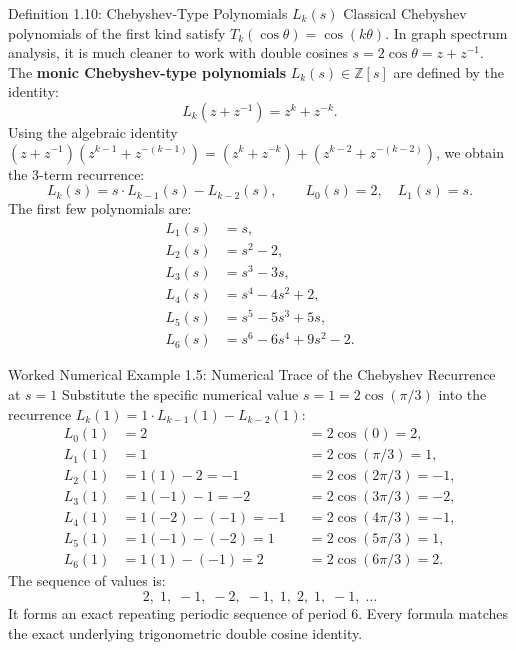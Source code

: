 \documentclass[11pt]{article}
\begin{document}
\begin{defbox}{Definition 1.10: Chebyshev-Type Polynomials $L_k(s)$}
Classical Chebyshev polynomials of the first kind satisfy $T_k(\cos\theta) = \cos(k\theta)$. 
In graph spectrum analysis, it is much cleaner to work with double cosines $s = 2\cos\theta = z + z^{-1}$.
The \textbf{monic Chebyshev-type polynomials} $L_k(s) \in \mathbb{Z}[s]$ are defined by the identity:
\begin{equation}
  L_k\left(z + z^{-1}\right) = z^k + z^{-k}.
\end{equation}
Using the algebraic identity $(z + z^{-1})(z^{k-1} + z^{-(k-1)}) = (z^k + z^{-k}) + (z^{k-2} + z^{-(k-2)})$, we obtain the 3-term recurrence:
\begin{equation}
  L_k(s) = s \cdot L_{k-1}(s) - L_{k-2}(s), \qquad L_0(s) = 2, \quad L_1(s) = s.
\end{equation}
The first few polynomials are:
\begin{align}
  L_1(s) &= s, \\
  L_2(s) &= s^2 - 2, \\
  L_3(s) &= s^3 - 3s, \\
  L_4(s) &= s^4 - 4s^2 + 2, \\
  L_5(s) &= s^5 - 5s^3 + 5s, \\
  L_6(s) &= s^6 - 6s^4 + 9s^2 - 2.
\end{align}
\end{defbox}

\begin{callbox}{Worked Numerical Example 1.5: Numerical Trace of the Chebyshev Recurrence at $s=1$}
Substitute the specific numerical value $s = 1 = 2\cos(\pi/3)$ into the recurrence $L_k(1) = 1 \cdot L_{k-1}(1) - L_{k-2}(1)$:
\begin{align}
  L_0(1) &= 2 && = 2\cos(0) = 2, \\
  L_1(1) &= 1 && = 2\cos(\pi/3) = 1, \\
  L_2(1) &= 1(1) - 2 = -1 && = 2\cos(2\pi/3) = -1, \\
  L_3(1) &= 1(-1) - 1 = -2 && = 2\cos(3\pi/3) = -2, \\
  L_4(1) &= 1(-2) - (-1) = -1 && = 2\cos(4\pi/3) = -1, \\
  L_5(1) &= 1(-1) - (-2) = 1 && = 2\cos(5\pi/3) = 1, \\
  L_6(1) &= 1(1) - (-1) = 2 && = 2\cos(6\pi/3) = 2.
\end{align}
The sequence of values is:
\begin{equation}
  2, \; 1, \; -1, \; -2, \; -1, \; 1, \; 2, \; 1, \; -1, \; \dots
\end{equation}
It forms an exact repeating periodic sequence of period 6.
Every formula matches the exact underlying trigonometric double cosine identity.
\end{callbox}
\end{document}
